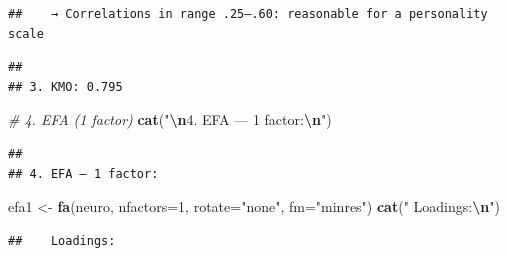 \documentclass[
]{article}
\newenvironment{Shaded}{\begin{snugshade}}{\end{snugshade}}
\newcommand{\AttributeTok}[1]{\textcolor[rgb]{0.13,0.29,0.53}{#1}}
\newcommand{\CommentTok}[1]{\textcolor[rgb]{0.56,0.35,0.01}{\textit{#1}}}
\newcommand{\DecValTok}[1]{\textcolor[rgb]{0.00,0.00,0.81}{#1}}
\newcommand{\FunctionTok}[1]{\textcolor[rgb]{0.13,0.29,0.53}{\textbf{#1}}}
\newcommand{\NormalTok}[1]{#1}
\newcommand{\OtherTok}[1]{\textcolor[rgb]{0.56,0.35,0.01}{#1}}
\newcommand{\SpecialCharTok}[1]{\textcolor[rgb]{0.81,0.36,0.00}{\textbf{#1}}}
\newcommand{\StringTok}[1]{\textcolor[rgb]{0.31,0.60,0.02}{#1}}
\newcounter{none} %
\begin{document}
\begin{verbatim}
##    → Correlations in range .25–.60: reasonable for a personality scale
\end{verbatim}

\begin{Shaded}
\end{Shaded}

\begin{verbatim}
## 
## 3. KMO: 0.795
\end{verbatim}

\begin{Shaded}
\begin{Highlighting}[]
\CommentTok{\# 4. EFA (1 factor)}
\FunctionTok{cat}\NormalTok{(}\StringTok{"}\SpecialCharTok{\textbackslash{}n}\StringTok{4. EFA — 1 factor:}\SpecialCharTok{\textbackslash{}n}\StringTok{"}\NormalTok{)}
\end{Highlighting}
\end{Shaded}

\begin{verbatim}
## 
## 4. EFA — 1 factor:
\end{verbatim}

\begin{Shaded}
\begin{Highlighting}[]
\NormalTok{efa1 }\OtherTok{\textless{}{-}} \FunctionTok{fa}\NormalTok{(neuro, }\AttributeTok{nfactors=}\DecValTok{1}\NormalTok{, }\AttributeTok{rotate=}\StringTok{"none"}\NormalTok{, }\AttributeTok{fm=}\StringTok{"minres"}\NormalTok{)}
\FunctionTok{cat}\NormalTok{(}\StringTok{"   Loadings:}\SpecialCharTok{\textbackslash{}n}\StringTok{"}\NormalTok{)}
\end{Highlighting}
\end{Shaded}

\begin{verbatim}
##    Loadings:
\end{verbatim}

\begin{Shaded}
\end{Shaded}
\end{document}
